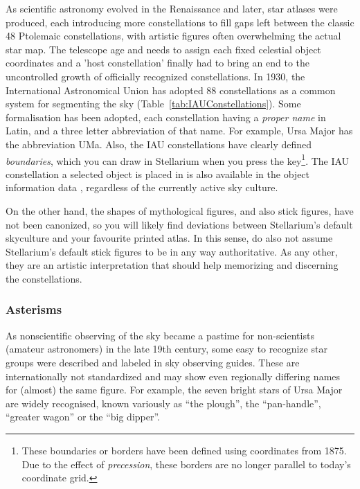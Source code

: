 As scientific astronomy evolved in the Renaissance and later, star atlases were produced, 
each introducing more constellations to fill gaps left between the classic 48 Ptolemaic constellations, 
with artistic figures often overwhelming the actual star map.
The telescope age and needs to assign each fixed celestial object coordinates and a 'host constellation' 
finally had to bring an end to the uncontrolled growth of officially recognized constellations. 
In 1930, the International Astronomical Union  has adopted 88 
constellations as a common system for segmenting the sky (Table~\ref{tab:IAUConstellations}). 
Some formalisation has been adopted, each constellation having a \emph{proper name} in Latin, 
and a three letter abbreviation of that name.  
For example, Ursa Major has the abbreviation UMa. Also, the IAU
constellations have clearly defined \emph{boundaries}\citep{Delporte:1930}, which you can draw in
Stellarium when you press the  key\footnote{These boundaries or
  borders have been defined using coordinates from 1875. Due to the effect
  of \emph{precession}, these borders are no longer parallel to
  today's coordinate grid.}. The IAU constellation a selected object is placed in 
is also available in the object information data \citep{1987PASP...99..695R}, 
regardless of the currently active sky culture.  

On the other hand, the shapes of mythological figures, and also stick figures, have not been canonized, so 
you will likely find deviations between Stellarium's default skyculture and your favourite printed atlas. 
In this sense, do also not assume Stellarium's default stick figures to be in any way authoritative. 
As any other, they are an artistic interpretation that should help memorizing and discerning the constellations.

\subsubsection{Asterisms}
\label{sec:Phenomena:Asterisms}

As nonscientific observing of the sky became a pastime for non-scientists (amateur astronomers) in the late 19th century, 
some easy to recognize star groups were described and labeled in sky observing guides. 
These are internationally not standardized and may show even regionally differing names for (almost) the same figure. 
For example, the seven bright stars of Ursa Major are widely recognised, known variously as ``the plough'', the
``pan-handle'', ``greater wagon'' or the ``big dipper''. 

